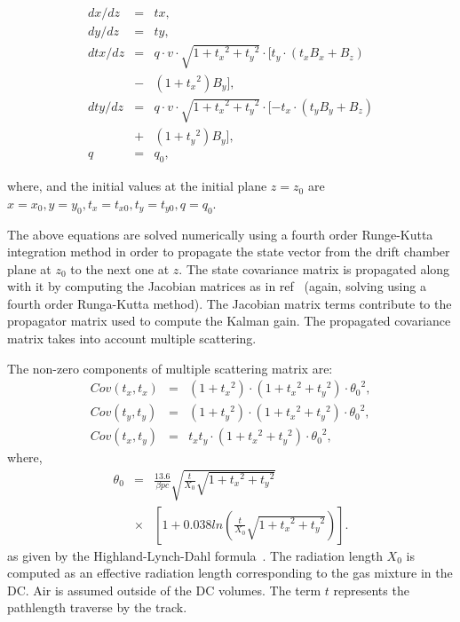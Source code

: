 \begin{eqnarray*}
dx/dz  &=& tx, \\
dy/dz  &=&  ty, \\
dtx/dz &=& q \cdot v \cdot \sqrt{1 + {t_x}^2 + {t_y}^2}\cdot [t_y\cdot (t_x B_x + B_z)\\ &-& (1 + {t_x}^2 ) B_y], \\
dty/dz  &=&  q \cdot v \cdot \sqrt{1 + {t_x}^2 + {t_y}^2}\cdot [-t_x\cdot (t_y B_y + B_z) \\&+& (1 + {t_y}^2 ) B_y], \\
q  &=&  q_0,
\end{eqnarray*}


where, and the initial values at the initial plane $z = z_{0}$ are
$x = x_{0}, y = y_{0}, t_x = t_{x0}, t_y = t_{y0}, q = q_{0}$.

The above equations are solved
numerically using a fourth order Runge-Kutta integration method in order to propagate the state vector from
the drift chamber plane at $z_{0}$ to the next one at $z$.  The state covariance matrix is propagated along with it
by computing the Jacobian matrices as in ref~\cite{spiri} (again, solving using a fourth order Runga-Kutta method).
The Jacobian matrix terms contribute to the propagator matrix used to compute the Kalman gain.
The propagated covariance matrix takes into account multiple scattering.

The non-zero components of multiple scattering matrix are:
\begin{eqnarray*}
Cov (t_{x} , t_{x}) &=& (1+{t_x}^{2} )\cdot (1+{t_x}^{2} + {t_y}^2 )\cdot {\theta_{0}}^{2} , \\
Cov (t_{y} , t_{y}) &=& (1+{t_y}^{2} )\cdot (1+{t_x}^{2} + {t_y}^2 )\cdot {\theta_{0}}^{2} , \\
Cov (t_{x} , t_{y}) &=&  t_{x} t_{y}\cdot (1+{t_x}^{2} + {t_y}^2 )\cdot {\theta_{0}}^{2} ,
\end{eqnarray*}
where,
\begin{eqnarray*}
{\theta_{0}} &=& \frac{13.6}{\beta pc}\sqrt{\frac{t}{X_{0}}\sqrt{1+{t_x}^2+{t_y}^2}}\\ &\times&\left[ {1+0.038 ln \left({\frac{t}{X_{0}}\sqrt{1+{t_x}^2+{t_y}^2}}\right) }\right].
\end{eqnarray*}
as given by the Highland-Lynch-Dahl formula~\cite{Highland-Lynch-Dahl}.
The radiation length $X_0$ is computed as an effective radiation length corresponding to the gas mixture in the DC.
Air is assumed outside of the DC volumes. The term $t$ represents the pathlength traverse by the track.

